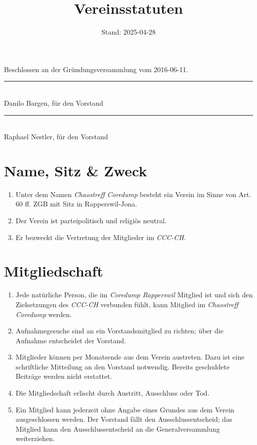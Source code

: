 \documentclass[10pt,a4paper,parskip,fleqn]{scrartcl}
\title{\Huge Vereinsstatuten}
\date{Stand: 2025-04-28}
\newcommand{\ol}{\begin{enumerate}[itemsep=-0.2em,topsep=-0.2em]}
\newcommand{\lo}{\end{enumerate}}
\newcommand{\li}{\item}
\newcommand{\name}{Chaostreff Coredump\xspace}
\newcommand{\iname}{\textit{\name}\xspace}
\newcommand{\parent}{Coredump Rapperswil\xspace}
\newcommand{\iparent}{\textit{\parent}\xspace}
\newcommand{\cccch}{CCC-CH\xspace}
\newcommand{\icccch}{\textit{\cccch}\xspace}
\begin{document}
\begin{titlepage}

	\maketitle
	\thispagestyle{empty} %

  \begin{center}

		\vspace{1cm}

		\theverbbox

		\vfill

		\large Beschlossen an der Gründungsversammlung vom 2016-06-11.

		\vspace{1.5cm}

		\begin{minipage}[t]{0.49\textwidth}
			\center
			\rule{5cm}{0.2mm}\\
			Danilo Bargen, für den Vorstand
		\end{minipage}
		\begin{minipage}[t]{0.49\textwidth}
			\center
			\rule{5cm}{0.2mm}\\
			Raphael Nestler, für den Vorstand
		\end{minipage}

  \end{center}

\end{titlepage}


\section{Name, Sitz \& Zweck}

\ol
	\li Unter dem Namen \iname besteht ein Verein im Sinne von Art. 60
	ff. ZGB mit Sitz in Rapperswil-Jona.
	\li Der Verein ist parteipolitisch und religiös neutral.
	\li Er bezweckt die Vertretung der Mitglieder im \icccch.
\lo


\section{Mitgliedschaft}

\ol
  \li Jede natürliche Person, die im \iparent Mitglied ist und sich den
	Zielsetzungen des \icccch verbunden fühlt, kann Mitglied im \iname werden.
	\li Aufnahmegesuche sind an ein Vorstandsmitglied zu richten; über die
	Aufnahme entscheidet der Vorstand.
	\li Mitglieder können per Monatsende aus dem Verein austreten. Dazu ist eine
	schriftliche Mitteilung an den Vorstand notwendig. Bereits geschuldete
	Beiträge werden nicht erstattet.
	\li Die Mitgliedschaft erlischt durch Austritt, Ausschluss oder Tod.
	\li Ein Mitglied kann jederzeit ohne Angabe eines Grundes aus dem Verein
	ausgeschlossen werden. Der Vorstand fällt den Ausschlussentscheid; das
	Mitglied kann den Ausschlussentscheid an die Generalversammlung weiterziehen.
\lo
\end{document}
